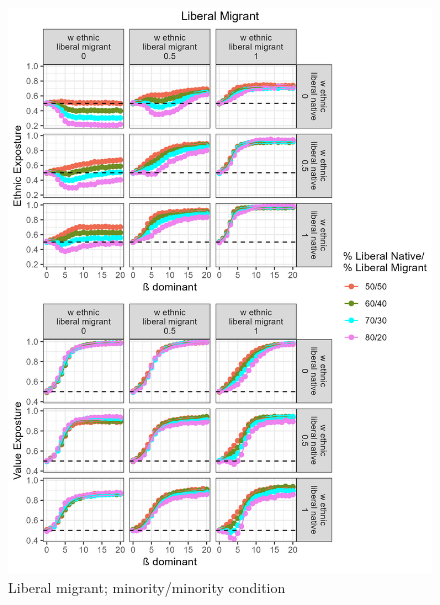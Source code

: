 \documentclass[
]{article}
\begin{document}
\begin{figure}[H]
    \centering
    \includegraphics{images/Liberal Migrant_vlsz.jpg}
    \caption{Liberal migrant; minority/minority condition}
    \label{fig:libmig}
\end{figure}

\renewcommand\refname{References}
  
\end{document}
